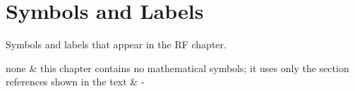 \section*{Symbols and Labels}
Symbols and labels that appear in the RF chapter.
\begin{symtable}
\(\text{none}\) & this chapter contains no mathematical symbols; it uses only the section references shown in the text & - \\ \hline
\end{symtable}
